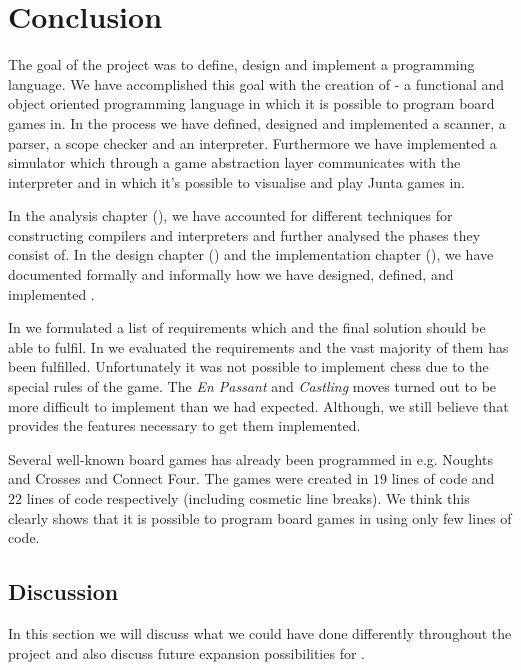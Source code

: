 \chapter{Conclusion}
\label{chap:conclusion}

The goal of the project was to define, design and implement a programming language. 
We have accomplished this goal with the creation of \productname{} - a functional and object oriented programming
language in which it is possible to program board games in. In the process we have defined, 
designed and implemented a scanner, a parser, a scope checker and an interpreter. 
Furthermore we have implemented a simulator which through a game abstraction layer 
communicates with the interpreter and in which it's possible to visualise and play Junta games in.

In the analysis chapter (), we
have accounted for different techniques for constructing compilers and interpreters 
and further analysed the phases they consist of. In the design
chapter () and the implementation chapter
(), we have documented formally and
informally how we have designed, defined, and implemented \productname{}.

In  we formulated a list of requirements which \productname{} and the final solution should be
able to fulfil. In  we evaluated the requirements and the vast majority of them has been fulfilled. Unfortunately it was not possible to implement chess due to the special rules of the game.
The \textit{En Passant} and \textit{Castling} moves turned out to be more
difficult to implement than we had expected. Although, we still believe that \productname{} provides the features 
necessary to get them implemented.

Several well-known board games has already been programmed in \productname{} e.g. Noughts and
Crosses and Connect Four. The games were created in $19$ lines of code and $22$ lines of code respectively (including cosmetic line breaks). We think this clearly shows that it is possible to program board games in \productname{} using only few lines of code.

\section{Discussion}
\label{sec:discussion}

In this section we will discuss what we could have done differently throughout
the project and also discuss future expansion possibilities for \productname{}.

%






